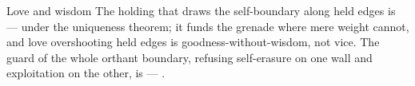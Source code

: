 \documentclass[../main]{subfiles}
\begin{document}
\begin{statement}{}{Love and wisdom}
The holding that draws the self-boundary along held edges is  ---
 under the uniqueness theorem; it funds the grenade where mere weight cannot,
and love overshooting held edges is goodness-without-wisdom, not vice. The guard of the whole
orthant boundary, refusing self-erasure on one wall and exploitation on the other, is
 --- .
\end{statement}

\end{document}
